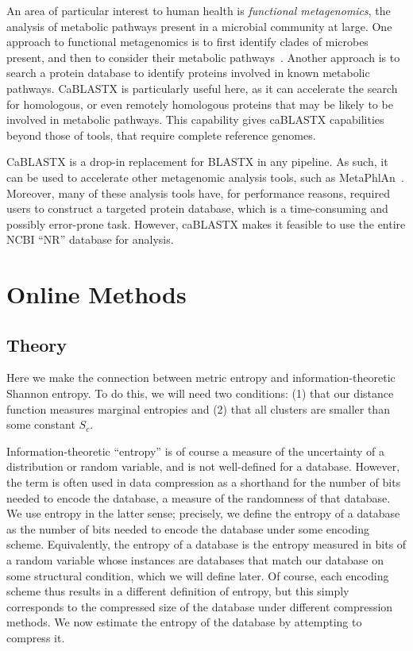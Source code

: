 \documentclass[review,preprint,12pt]{elsarticle}
\theoremstyle{definition}
\theoremstyle{remark}
\numberwithin{equation}{section}
\begin{document}
An area of particular interest to human health is \emph{functional 
metagenomics}, the analysis of metabolic pathways present in a microbial
community at large.
One approach to functional metagenomics is to first identify clades of
microbes present, and then to consider their metabolic pathways~\cite{blah}.
Another approach is to search a protein database to identify proteins involved
in known metabolic pathways.
CaBLASTX is particularly useful here, as it can accelerate the search for
homologous, or even remotely homologous proteins that may be likely to be
involved in metabolic pathways.
This capability gives caBLASTX capabilities beyond those of tools, that require
complete reference genomes.

CaBLASTX is a drop-in replacement for BLASTX in any pipeline.
As such, it can be used to accelerate other metagenomic analysis tools, such
as MetaPhlAn~\cite{blah}.
Moreover, many of these analysis tools have, for performance reasons, required
users to construct a targeted protein database, which is a time-consuming and
possibly error-prone task.
However, caBLASTX makes it feasible to use the entire NCBI ``NR'' database for
analysis.

\section{Online Methods}

\subsection{Theory}
Here we make the connection between metric entropy and information-theoretic Shannon entropy.
To do this, we will need two conditions: (1) that our distance function measures marginal entropies and (2) that all clusters are smaller than some constant $S_c$.

Information-theoretic ``entropy'' is of course a measure of the uncertainty of a distribution or random variable, and is not well-defined for a database.
However, the term is often used in data compression as a shorthand for the number of bits needed to encode the database, a measure of the randomness of that database.
We use entropy in the latter sense; precisely, we define the entropy of a database as the number of bits needed to encode the database under some encoding scheme.
Equivalently, the entropy of a database is the entropy measured in bits of a random variable whose instances are databases that match our database on some structural condition, which we will define later.
Of course, each encoding scheme thus results in a different definition of entropy, but this simply corresponds to the compressed size of the database under different compression methods.
We now estimate the entropy of the database by attempting to compress it.
\end{document}
